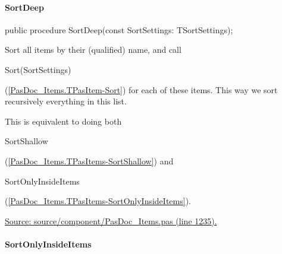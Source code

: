 \documentclass{report}
\newif\ifpdf
\begin{document}
\paragraph*{SortDeep}\hspace*{\fill}

\label{PasDoc_Items.TPasItems-SortDeep}
\begin{list}{}{
\setlength{\itemindent}{0cm}
\setlength{\listparindent}{0cm}
\setlength{\leftmargin}{\evensidemargin}
\addtolength{\leftmargin}{\tmplength}
\settowidth{\labelsep}{X}
\addtolength{\leftmargin}{\labelsep}
\setlength{\labelwidth}{\tmplength}
}
\item[\textbf{Declaration}\hfill]
\ifpdf
\begin{flushleft}
\fi
\begin{ttfamily}
public procedure SortDeep(const SortSettings: TSortSettings);\end{ttfamily}

\ifpdf
\end{flushleft}
\fi

\par
\item[\textbf{Description}]
Sort all items by their (qualified) name, and call \begin{ttfamily}Sort(SortSettings)\end{ttfamily}(\ref{PasDoc_Items.TPasItem-Sort}) for each of these items. This way we sort recursively everything in this list.

This is equivalent to doing both \begin{ttfamily}SortShallow\end{ttfamily}(\ref{PasDoc_Items.TPasItems-SortShallow}) and \begin{ttfamily}SortOnlyInsideItems\end{ttfamily}(\ref{PasDoc_Items.TPasItems-SortOnlyInsideItems}).\par
\href{https://github.com/pasdoc/pasdoc/blob/master/source/component/PasDoc_Items.pas#L1235}{Source: source/component/PasDoc{\_}Items.pas (line 1235).}

\end{list}
\paragraph*{SortOnlyInsideItems}\hspace*{\fill}
\end{document}
